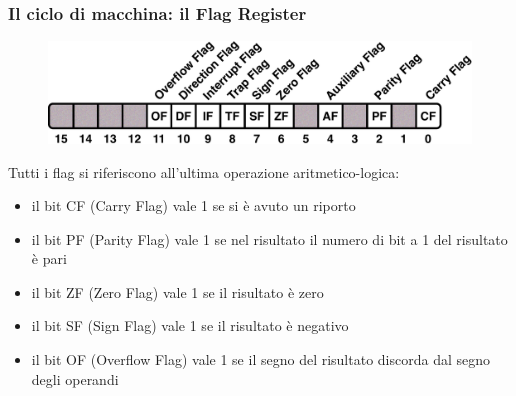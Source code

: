 \begin{frame}
	\frametitle{Il ciclo di macchina: il Flag Register}
	
	\begin{figure}[!htbp] 
		\centering
		\includegraphics[width=0.7\linewidth]{images/4_cpu/flag_register.pdf}
		\label{fig:cpu_complex}
	\end{figure}
	

	Tutti i flag si riferiscono all'ultima operazione aritmetico-logica:
	\begin{itemize}
		\item il bit CF (Carry Flag) vale 1 se si è avuto un riporto
		\item il bit PF (Parity Flag) vale 1 se nel risultato il numero di bit a 1 del risultato è pari
		\item il bit ZF (Zero Flag) vale 1 se il risultato è zero
		\item il bit SF (Sign Flag) vale 1 se  il risultato è negativo
		\item il bit OF (Overflow Flag) vale 1 se il segno del risultato discorda dal segno degli operandi
	\end{itemize}	 
\end{frame}



